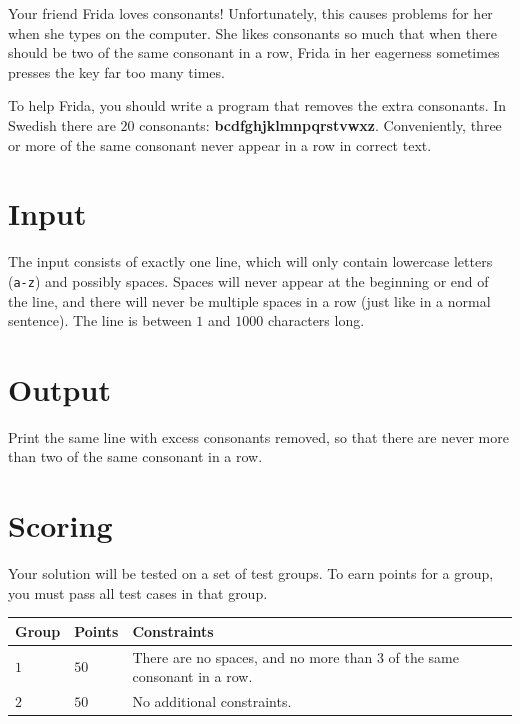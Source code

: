 Your friend Frida loves consonants! Unfortunately, this causes problems for her when she types on the computer. She likes consonants so much that when there should be two of the same consonant in a row, Frida in her eagerness sometimes presses the key far too many times.

To help Frida, you should write a program that removes the extra consonants. In Swedish there are $20$ consonants: \textbf{bcdfghjklmnpqrstvwxz}. Conveniently, three or more of the same consonant never appear in a row in correct text.

\section*{Input}
The input consists of exactly one line, which will only contain lowercase letters (\texttt{a-z}) and possibly spaces. Spaces will never appear at the beginning or end of the line, and there will never be multiple spaces in a row (just like in a normal sentence). The line is between $1$ and $1000$ characters long.

\section*{Output}
Print the same line with excess consonants removed, so that there are never more than two of the same consonant in a row.

\section*{Scoring}
Your solution will be tested on a set of test groups.
To earn points for a group, you must pass all test cases in that group.

\noindent
\begin{tabular}{| l | l | p{12cm} |}
  \hline
  \textbf{Group} & \textbf{Points} & \textbf{Constraints} \\ \hline
    $1$   & $50$     & There are no spaces, and no more than 3 of the same consonant in a row. \\ \hline
    $2$   & $50$     & No additional constraints. \\ \hline
\end{tabular}
